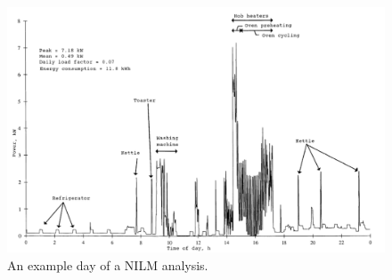 \begin{figure}[tbp]
  \centering
  \includegraphics[width=1\textwidth]{images/nilm.png}
  \caption[Short description]{An example day of a NILM analysis.}
  \label{fig:Nilm}
\end{figure}
